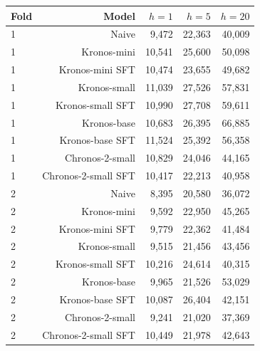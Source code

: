 \begin{tabular}{@{}lrrrr@{}}
\toprule
Fold & Model & $h=1$ & $h=5$ & $h=20$ \\
\midrule
1 & Naive & 9,472 & 22,363 & 40,009 \\
1 & Kronos-mini & 10,541 & 25,600 & 50,098 \\
1 & Kronos-mini SFT & 10,474 & 23,655 & 49,682 \\
1 & Kronos-small & 11,039 & 27,526 & 57,831 \\
1 & Kronos-small SFT & 10,990 & 27,708 & 59,611 \\
1 & Kronos-base & 10,683 & 26,395 & 66,885 \\
1 & Kronos-base SFT & 11,524 & 25,392 & 56,358 \\
1 & Chronos-2-small & 10,829 & 24,046 & 44,165 \\
1 & Chronos-2-small SFT & 10,417 & 22,213 & 40,958 \\
\midrule
2 & Naive & 8,395 & 20,580 & 36,072 \\
2 & Kronos-mini & 9,592 & 22,950 & 45,265 \\
2 & Kronos-mini SFT & 9,779 & 22,362 & 41,484 \\
2 & Kronos-small & 9,515 & 21,456 & 43,456 \\
2 & Kronos-small SFT & 10,216 & 24,614 & 40,315 \\
2 & Kronos-base & 9,965 & 21,526 & 53,029 \\
2 & Kronos-base SFT & 10,087 & 26,404 & 42,151 \\
2 & Chronos-2-small & 9,241 & 21,020 & 37,369 \\
2 & Chronos-2-small SFT & 10,449 & 21,978 & 42,643 \\
\bottomrule
\end{tabular}
